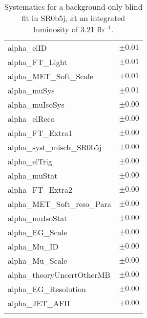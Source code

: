 \begin{table}
\begin{center}
\begin{tabular*}{\textwidth}{@{\extracolsep{\fill}}lc}
alpha\_elID         & $\pm 0.01$       \\
alpha\_FT\_Light         & $\pm 0.01$       \\
alpha\_MET\_Soft\_Scale         & $\pm 0.01$       \\
alpha\_muSys         & $\pm 0.01$       \\
alpha\_muIsoSys         & $\pm 0.00$       \\
alpha\_elReco         & $\pm 0.00$       \\
alpha\_FT\_Extra1         & $\pm 0.00$       \\
alpha\_syst\_misch\_SR0b5j         & $\pm 0.00$       \\
alpha\_elTrig         & $\pm 0.00$       \\
alpha\_muStat         & $\pm 0.00$       \\
alpha\_FT\_Extra2         & $\pm 0.00$       \\
alpha\_MET\_Soft\_reso\_Para         & $\pm 0.00$       \\
alpha\_muIsoStat         & $\pm 0.00$       \\
alpha\_EG\_Scale         & $\pm 0.00$       \\
alpha\_Mu\_ID         & $\pm 0.00$       \\
alpha\_Mu\_Scale         & $\pm 0.00$       \\
alpha\_theoryUncertOtherMB         & $\pm 0.00$       \\
alpha\_EG\_Resolution         & $\pm 0.00$       \\
alpha\_JET\_AFII         & $\pm 0.00$       \\
\noalign{\smallskip}\hline\noalign{\smallskip}
\end{tabular*}
\end{center}
\caption{Systematics for a background-only blind fit in SR0b5j, at an integrated luminosity of 3.21 fb$^{-1}$.}
\label{tab:histfitter:syst:bgonly:SR0b5j}
\end{table}
%



